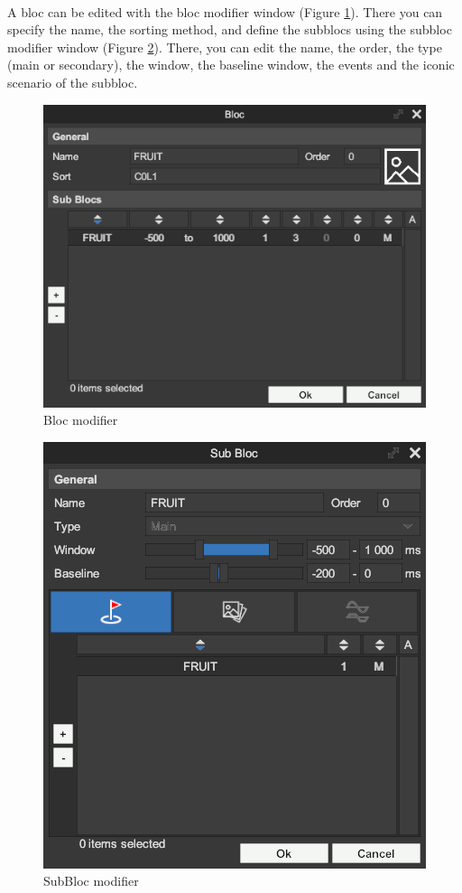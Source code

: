 \documentclass[a4paper]{article}
\begin{document}
\paragraph{} A bloc can be edited with the bloc modifier window (Figure \ref{blocModifierUI}). There you can specify the name, the sorting method, and define the subblocs using the subbloc modifier window (Figure \ref{subBlocModifierUI}). There, you can edit the name, the order, the type (main or secondary), the window, the baseline window, the events and the iconic scenario of the subbloc.
\begin{figure}[H]
\begin{center}
\includegraphics[scale=0.5]{BlocModifier.png}
\end{center}
\caption{\label{blocModifierUI}Bloc modifier}
\end{figure}
\begin{figure}[H]
\begin{center}
\includegraphics[scale=0.5]{SubBlocModifier.png}
\end{center}
\caption{\label{subBlocModifierUI}SubBloc modifier}
\end{figure}
\end{document}
